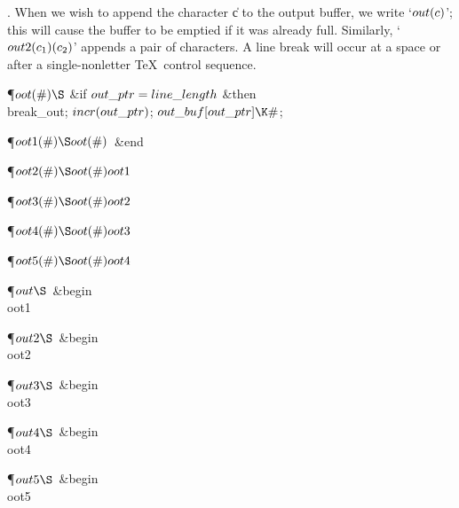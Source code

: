 . When we wish to append the character \|c to the output buffer, we write
`$\\{out}(c)$'; this will cause the buffer to be emptied if it was already
full. Similarly, `$\\{out2}(c_1)(c_2)$' appends a pair of characters.
A line break will occur at a space or after a single-nonletter
\TeX\ control sequence.

\Y\P\D {}$\\{oot}(\#)\S$\6
\&{if} $\\{out\_ptr}=\\{line\_length}$ \1\&{then}\5
\\{break\_out};\2\6
$\\{incr}(\\{out\_ptr})$;\5
$\\{out\_buf}[\\{out\_ptr}]\K\#$;\par
\P\D {}$\\{oot1}(\#)\S\\{oot}(\#)$\ \&{end} \par
\P\D {}$\\{oot2}(\#)\S\\{oot}(\#)\,\\{oot1}$\par
\P\D {}$\\{oot3}(\#)\S\\{oot}(\#)\,\\{oot2}$\par
\P\D {}$\\{oot4}(\#)\S\\{oot}(\#)\,\\{oot3}$\par
\P\D {}$\\{oot5}(\#)\S\\{oot}(\#)\,\\{oot4}$\par
\P\D {}$\\{out}\S$\ \&{begin} \\{oot1}\par
\P\D {}$\\{out2}\S$\ \&{begin} \\{oot2}\par
\P\D {}$\\{out3}\S$\ \&{begin} \\{oot3}\par
\P\D {}$\\{out4}\S$\ \&{begin} \\{oot4}\par
\P\D {}$\\{out5}\S$\ \&{begin} \\{oot5}\par
\fi

